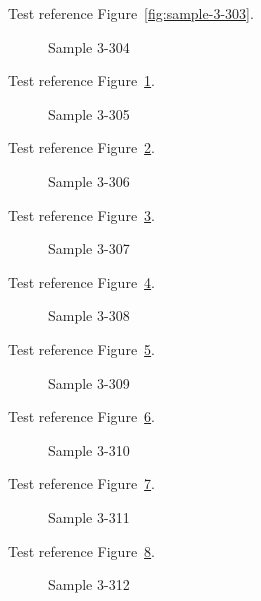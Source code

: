 Test reference Figure~\ref{fig:sample-3-303}.

\begin{figure}[tbhp]
\caption{Sample 3-304}
\label{fig:sample-3-304}
\end{figure}

Test reference Figure~\ref{fig:sample-3-304}.

\begin{figure}[tbhp]
\caption{Sample 3-305}
\label{fig:sample-3-305}
\end{figure}

Test reference Figure~\ref{fig:sample-3-305}.

\begin{figure}[tbhp]
\caption{Sample 3-306}
\label{fig:sample-3-306}
\end{figure}

Test reference Figure~\ref{fig:sample-3-306}.

\begin{figure}[tbhp]
\caption{Sample 3-307}
\label{fig:sample-3-307}
\end{figure}

Test reference Figure~\ref{fig:sample-3-307}.

\begin{figure}[tbhp]
\caption{Sample 3-308}
\label{fig:sample-3-308}
\end{figure}

Test reference Figure~\ref{fig:sample-3-308}.

\begin{figure}[tbhp]
\caption{Sample 3-309}
\label{fig:sample-3-309}
\end{figure}

Test reference Figure~\ref{fig:sample-3-309}.

\begin{figure}[tbhp]
\caption{Sample 3-310}
\label{fig:sample-3-310}
\end{figure}

Test reference Figure~\ref{fig:sample-3-310}.

\begin{figure}[tbhp]
\caption{Sample 3-311}
\label{fig:sample-3-311}
\end{figure}

Test reference Figure~\ref{fig:sample-3-311}.

\begin{figure}[tbhp]
\caption{Sample 3-312}
\label{fig:sample-3-312}
\end{figure}

